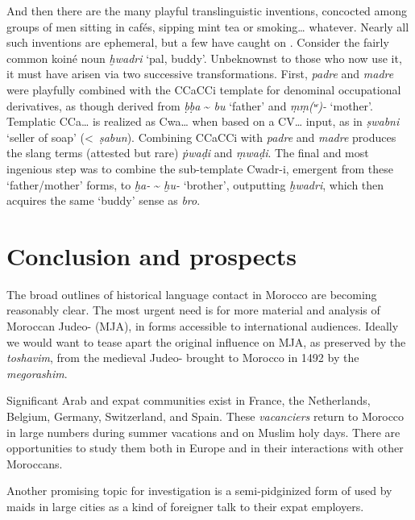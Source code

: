 \documentclass[output=paper]{langsci/langscibook}
\begin{document}
And then there are the many playful translinguistic inventions, concocted among groups of men sitting in cafés, sipping mint tea or smoking… whatever. Nearly all such inventions are ephemeral, but a few have caught on \citep{Heath1987}. Consider the fairly common koiné noun \textit{ḫwadri} ‘pal, buddy’. Unbeknownst to those who now use it, it must have arisen via two successive transformations. First,  \textit{padre} and \textit{madre} were playfully combined with the CCaCCi template for denominal occupational derivatives, as though derived from  \textit{ḅḅa} {\textasciitilde} \textit{bu} ‘father’ and  \textit{ṃṃ(ʷ)-} ‘mother’. Templatic CCa… is realized as Cwa… when based on a CV… input, as in \textit{ṣwabni} ‘seller of soap’ (<~\textit{ṣabun}). Combining CCaCCi with \textit{padre} and \textit{madre} produces the slang terms (attested but rare) \textit{ṗwaḍ{\R}i} and \textit{ṃwaḍ{\R}i}. The final and most ingenious step was to combine the sub-template Cwadr-i, emergent from these ‘father/mother’ forms, to \textit{ḫa-} {\textasciitilde} \textit{ḫu-} ‘brother’, outputting \textit{ḫwadri}, which then acquires the same ‘buddy’ sense as   \textit{bro}. 

\section{Conclusion and prospects}

The broad outlines of historical language contact in Morocco are becoming reasonably clear. The most urgent need is for more material and analysis of Mor\-occan Judeo- (MJA), in forms accessible to international audiences. Ideally we would want to tease apart the original  influence on  MJA, as preserved by the \textit{toshavim}, from the medieval Judeo- brought to Morocco in 1492 by the \textit{megorashim}. 

Significant  Arab and  expat communities exist in France, the Netherlands, Belgium, Germany, Switzerland, and Spain. These \textit{vacanciers} return to Morocco in large numbers during summer vacations and on Muslim holy days. There are opportunities to study them both in Europe \citep{Nortier1990} and in their interactions with other Moroccans. 

Another promising topic for investigation is a semi-pidginized form of  used by  maids in large cities as a kind of foreigner talk to their expat  employers.
\end{document}
